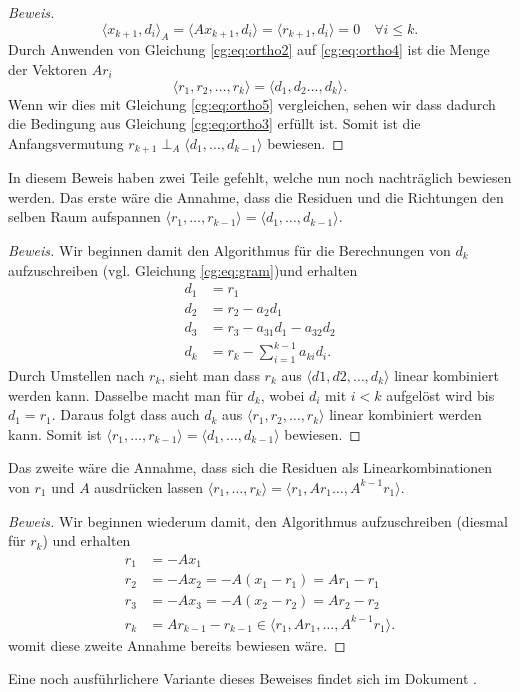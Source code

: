 \begin{proof}[Beweis]
\begin{equation}\label{cg:eq:ortho5}
	\langle x_{k+1}, d_i \rangle_A = \langle Ax_{k+1}, d_i \rangle = \langle r_{k+1}, d_i \rangle = 0 \quad \forall i \le k.
\end{equation}
Durch Anwenden von Gleichung \eqref{cg:eq:ortho2} auf \eqref{cg:eq:ortho4} ist die Menge der Vektoren $Ar_i$
\begin{equation}
	\langle r_1, r_2, \dots , r_k \rangle = \langle d_1, d_2 \dots ,d_k \rangle.
\end{equation} 
Wenn wir dies mit Gleichung \eqref{cg:eq:ortho5} vergleichen, sehen wir dass dadurch die Bedingung aus Gleichung \eqref{cg:eq:ortho3} erfüllt ist.
Somit ist die Anfangsvermutung $r_{k+1} \perp_A \langle d_1, \dots ,d_{k-1} \rangle$ bewiesen.
\end{proof}

In diesem Beweis haben zwei Teile gefehlt, welche nun noch nachträglich bewiesen werden.
Das erste wäre die Annahme, dass die Residuen und die Richtungen den selben Raum aufspannen $\langle r_1, \dots ,r_{k-1} \rangle = \langle d_1, \dots ,d_{k-1} \rangle$.

\begin{proof}[Beweis]
Wir beginnen damit den Algorithmus für die Berechnungen von $d_k$ aufzuschreiben (vgl. Gleichung \eqref{cg:eq:gram})und erhalten
\begin{align}
	d_1 &= r_1 \nonumber\\
	d_2	&= r_2 - a_2 d_1\nonumber\\
	d_3	&= r_3 - a_{31} d_1 - a_{32} d_2\nonumber\\
	d_k &= r_k - \sum_{i=1}^{k-1} a_{ki} d_i.
\end{align}
Durch Umstellen nach $r_k$, sieht man dass $r_k$ aus $\langle d1, d2, \dots, d_k \rangle$ linear kombiniert werden kann.
Dasselbe macht man für $d_k$, wobei $d_i$ mit $i<k$ aufgelöst wird bis $d_1 = r_1$.
Daraus folgt dass auch $d_k$ aus $\langle r_1, r_2, \dots, r_k \rangle$ linear kombiniert werden kann.
Somit ist $\langle r_1, \dots ,r_{k-1} \rangle = \langle d_1, \dots ,d_{k-1} \rangle$ bewiesen.
\end{proof}

Das zweite wäre die Annahme, dass sich die Residuen als Linearkombinationen von $r_1$ und $A$ ausdrücken lassen $\langle r_1, \dots ,r_k \rangle = \langle r_1, Ar_1 \dots ,A^{k-1}r_1 \rangle$.

\begin{proof}[Beweis]
Wir beginnen wiederum damit, den Algorithmus aufzuschreiben (diesmal für $r_k$) und erhalten
\begin{align}
	r_1 &= -Ax_1 \\
	r_2	&= -Ax_2 = -A(x_1-r_1) = Ar_1 - r_1 \nonumber\\
	r_3 &= -Ax_3 = -A(x_2-r_2) = Ar_2 - r_2 \nonumber\\
	r_k &= Ar_{k-1} - r_{k-1} \in \langle r_1, Ar_1, \dots, A^{k-1}r_1 \rangle.
\end{align}
womit diese zweite Annahme bereits bewiesen wäre.
\end{proof}

Eine noch ausführlichere Variante dieses Beweises findet sich im Dokument \cite{cg:online:cgmueller}.

	

